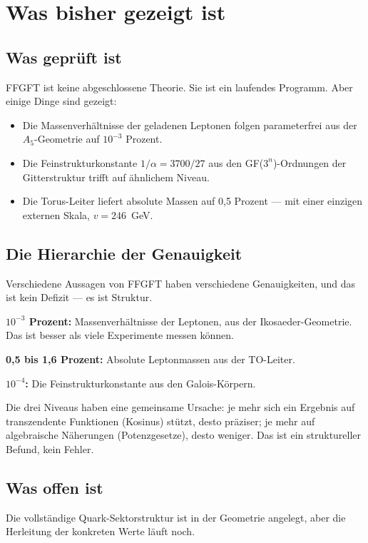 \documentclass[12pt,oneside]{book}
\begin{document}
\chapter{Was bisher gezeigt ist}

\section{Was geprüft ist}

FFGFT ist keine abgeschlossene Theorie. Sie ist ein laufendes Programm. Aber einige Dinge sind gezeigt:

\begin{itemize}
\item Die Massenverhältnisse der geladenen Leptonen folgen parameterfrei aus der $A_5$-Geometrie auf $10^{-3}$ Prozent.
\item Die Fein\-struktur\-konstante $1/\alpha = 3700/27$ aus den GF($3^n$)-Ordnungen der Gitterstruktur trifft auf ähnlichem Niveau.
\item Die Torus-Leiter liefert absolute Massen auf 0,5 Prozent — mit einer einzigen externen Skala, $v = 246$~GeV.
\end{itemize}

\section{Die Hierarchie der Genauigkeit}

Verschiedene Aussagen von FFGFT haben verschiedene Genauigkeiten, und das ist kein Defizit — es ist Struktur.

\textbf{$10^{-3}$ Prozent:} Massenverhältnisse der Leptonen, aus der Ikosaeder-Geometrie. Das ist besser als viele Experimente messen können.

\textbf{0,5 bis 1,6 Prozent:} Absolute Leptonmassen aus der TO-Leiter.

\textbf{$10^{-4}$:} Die Fein\-struktur\-konstante aus den Galois-Körpern.

Die drei Niveaus haben eine gemeinsame Ursache: je mehr sich ein Ergebnis auf transzendente Funktionen (Kosinus) stützt, desto präziser; je mehr auf algebraische Näherungen (Potenzgesetze), desto weniger. Das ist ein struktureller Befund, kein Fehler.

\section{Was offen ist}

Die vollständige Quark-Sektorstruktur ist in der Geometrie angelegt, aber die Herleitung der konkreten Werte läuft noch.
\end{document}
